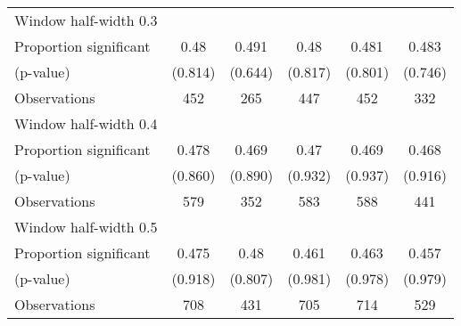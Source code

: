 \begin{tabular}{l*{5}{c}}
\hline
Window half-width 0.3\\

Proportion significant& 0.48 &  0.491 &  0.48 &  0.481 &  0.483\\

(p-value) & (0.814) &  (0.644) &  (0.817) &  (0.801) &  (0.746)\\

Observations& 452 &  265 &  447 &  452 &  332\\

\hline
Window half-width 0.4\\

Proportion significant& 0.478 &  0.469 &  0.47 &  0.469 &  0.468\\

(p-value) & (0.860) &  (0.890) &  (0.932) &  (0.937) &  (0.916)\\

Observations& 579 &  352 &  583 &  588 &  441\\

\hline
Window half-width 0.5\\

Proportion significant& 0.475 &  0.48 &  0.461 &  0.463 &  0.457\\

(p-value) & (0.918) &  (0.807) &  (0.981) &  (0.978) &  (0.979)\\

Observations& 708 &  431 &  705 &  714 &  529\\

\hline\hline
\end{tabular}

